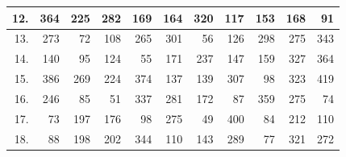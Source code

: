\begin{table}[H]
{\begin{tabular}{|r|r|r|r|r|r|r|r|r|r|r|}
12.                    & 364                            & 225                             & 282                              & 169                              & 164                              & 320                              & 117                              & 153                              & 168                              & 91                               \\ \hline
13.                    & 273                            & 72                              & 108                              & 265                              & 301                              & 56                               & 126                              & 298                              & 275                              & 343                              \\ \hline
14.                    & 140                            & 95                              & 124                              & 55                               & 171                              & 237                              & 147                              & 159                              & 327                              & 364                              \\ \hline
15.                    & 386                            & 269                             & 224                              & 374                              & 137                              & 139                              & 307                              & 98                               & 323                              & 419                              \\ \hline
16.                    & 246                            & 85                              & 51                               & 337                              & 281                              & 172                              & 87                               & 359                              & 275                              & 74                               \\ \hline
17.                    & 73                             & 197                             & 176                              & 98                               & 275                              & 49                               & 400                              & 84                               & 212                              & 110                              \\ \hline
18.                    & 88                             & 198                             & 202                              & 344                              & 110                              & 143                              & 289                              & 77                               & 321                              & 272                              \\ \hline

\end{tabular}}
\end{table}
